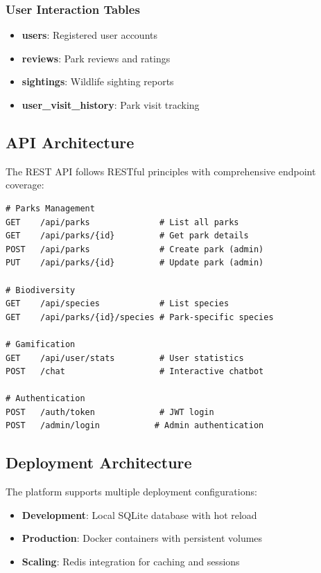 \documentclass[11pt,a4paper]{article}
\begin{document}
\subsubsection{User Interaction Tables}
\begin{itemize}
    \item \textbf{users}: Registered user accounts
    \item \textbf{reviews}: Park reviews and ratings
    \item \textbf{sightings}: Wildlife sighting reports
    \item \textbf{user\_visit\_history}: Park visit tracking
\end{itemize}

\subsection{API Architecture}

The REST API follows RESTful principles with comprehensive endpoint coverage:

\begin{lstlisting}[caption=Core API Endpoints]
# Parks Management
GET    /api/parks              # List all parks
GET    /api/parks/{id}         # Get park details
POST   /api/parks              # Create park (admin)
PUT    /api/parks/{id}         # Update park (admin)

# Biodiversity
GET    /api/species            # List species
GET    /api/parks/{id}/species # Park-specific species

# Gamification
GET    /api/user/stats         # User statistics
POST   /chat                   # Interactive chatbot

# Authentication
POST   /auth/token             # JWT login
POST   /admin/login           # Admin authentication
\end{lstlisting}

\subsection{Deployment Architecture}

The platform supports multiple deployment configurations:

\begin{itemize}
    \item \textbf{Development}: Local SQLite database with hot reload
    \item \textbf{Production}: Docker containers with persistent volumes
    \item \textbf{Scaling}: Redis integration for caching and sessions
\end{itemize}
\end{document}
